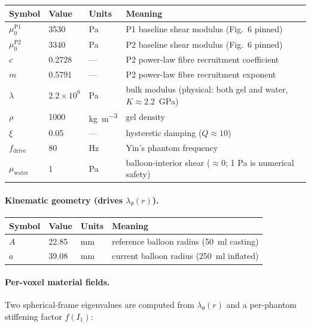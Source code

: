 \documentclass[11pt,letterpaper]{article}
\begin{document}
\begin{center}
\begin{tabular}{lllp{6.5cm}}
\toprule
Symbol & Value & Units & Meaning \\
\midrule
$\mu_0^{\text{P1}}$   & 3530       & \si{\pascal}                  & P1 baseline shear modulus (Fig.~6 pinned) \\
$\mu_0^{\text{P2}}$   & 3340       & \si{\pascal}                  & P2 baseline shear modulus (Fig.~6 pinned) \\
$c$          & 0.2728     & ---                           & P2 power-law fibre recruitment coefficient \\
$m$          & 0.5791     & ---                           & P2 power-law fibre recruitment exponent \\
$\lambda$    & $2.2 \times 10^{9}$ & \si{\pascal}         & bulk modulus (physical: both gel and water, $K \approx 2.2$~GPa) \\
$\rho$       & 1000       & \si{\kilogram\per\metre\cubed} & gel density \\
$\xi$        & 0.05       & ---                           & hysteretic damping ($Q\approx 10$) \\
$f_{\text{drive}}$ & 80   & \si{\hertz}                   & Yin's phantom frequency \\
$\mu_{\text{water}}$ & 1  & \si{\pascal}                  & balloon-interior shear ($\approx 0$; 1 Pa is numerical safety) \\
\bottomrule
\end{tabular}
\end{center}

\paragraph{Kinematic geometry (drives $\lambda_\theta(r)$).}

\begin{center}
\begin{tabular}{llll}
\toprule
Symbol & Value & Units & Meaning \\
\midrule
$A$ & 22.85 & \si{\milli\metre} & reference balloon radius (\SI{50}{\milli\litre} casting) \\
$a$ & 39.08 & \si{\milli\metre} & current balloon radius (\SI{250}{\milli\litre} inflated) \\
\bottomrule
\end{tabular}
\end{center}

\paragraph{Per-voxel material fields.}
Two spherical-frame eigenvalues are computed from $\lambda_\theta(r)$
and a per-phantom stiffening factor $f(I_1)$:
\end{document}
